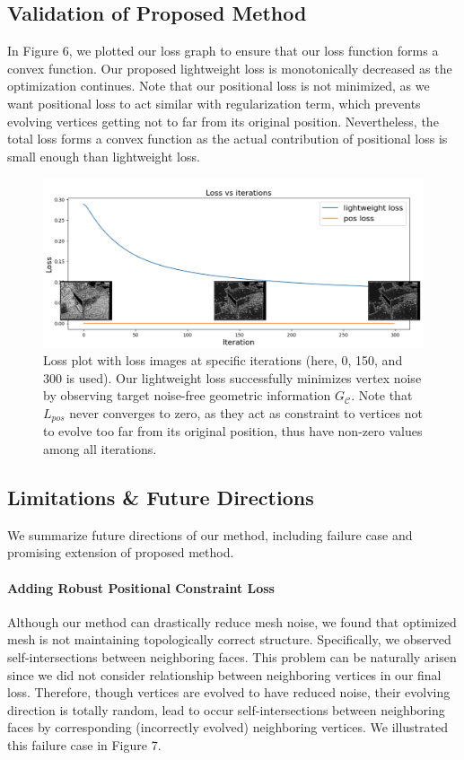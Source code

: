 \subsection{Validation of Proposed Method}
In Figure 6, we plotted our loss graph to ensure that our loss function forms a convex function. 
Our proposed lightweight loss is monotonically decreased as the optimization continues. 
Note that our positional loss is not minimized, as we want positional loss to act similar with regularization term, which prevents evolving vertices getting not to far from its original position. 
Nevertheless, the total loss forms a convex function as the actual contribution of positional loss is small enough than lightweight loss. 

\begin{figure}
    \includegraphics[width=\columnwidth]{figures/4_result_loss_plot_with_images.png}
    \caption{Loss plot with loss images at specific iterations (here, 0, 150, and 300 is used). Our lightweight loss successfully minimizes vertex noise by observing target noise-free geometric information $G_\mathcal{C}$. Note that $L_{pos}$ never converges to zero, as they act as constraint to vertices not to evolve too far from its original position, thus have non-zero values among all iterations.}
    \label{fig:loss_plot_with_images}
\end{figure}

\subsection{Limitations \& Future Directions}
We summarize future directions of our method, including failure case and promising extension of proposed method.
\paragraph{Adding Robust Positional Constraint Loss}
Although our method can drastically reduce mesh noise, we found that optimized mesh is not maintaining topologically correct structure. 
Specifically, we observed self-intersections between neighboring faces. 
This problem can be naturally arisen since we did not consider relationship between neighboring vertices in our final loss. 
Therefore, though vertices are evolved to have reduced noise, their evolving direction is totally random, lead to occur self-intersections between neighboring faces by corresponding (incorrectly evolved) neighboring vertices. 
We illustrated this failure case in Figure 7.


